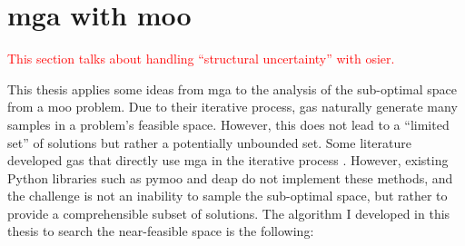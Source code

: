 \section{\acs{mga} with \acl{moo}}
\label{section:mga-moo}

\textcolor{red}{This section talks about handling ``structural uncertainty'' with \ac{osier}.}


This thesis applies some ideas from \ac{mga} to the analysis of the sub-optimal
space from a \acl{moo} problem. Due to their iterative process, \acp{ga}
naturally generate many samples in a problem's feasible space. However, this
does not lead to a ``limited set'' of solutions but rather a potentially
unbounded set. Some literature developed \acp{ga} that directly use \ac{mga} in
the iterative process
\cite{zechman_evolutionary_2004,zechman_evolutionary_2013}. However, existing
Python libraries such as \ac{pymoo} and \ac{deap} do not implement these
methods, and the challenge is not an inability to sample the sub-optimal space,
but rather to provide a comprehensible subset of solutions. The algorithm I
developed in this thesis to search the near-feasible space is the following:

